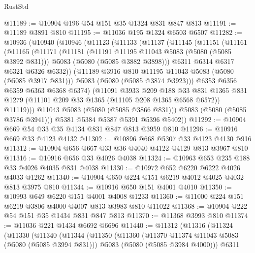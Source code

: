 \begin{lexlean}{RustStd}
\begin{coremodule}
@11189 := @10904 @196 @54 @151 @35 @1324 @831 @847 @813
@11191 := @11189 @3891 @810
@11195 := @11036 @195 @1324 @6503 @6507
@11282 := @10936
    (@10940
      (@10946
        (@11123
          (@11133
            (@11137
              (@11145
                (@11151
                  (@11161
                    (@11165
                      (@11171
                        (@11181
                          (@11191 @11195 @11043 @5083 (@5080 (@5085 @3892 @831)))
                          @5083
                          (@5080 (@5085 @3882 @3898)))
                        @6311
                        @6314
                        @6317
                        @6321
                        @6326
                        @6332))
                    (@11189 @3916 @810 @11195 @11043 @5083 (@5080 (@5085 @3917 @831)))
                    @5083
                    (@5080 (@5085 @3874 @3923)))
                  @6353
                  @6356
                  @6359
                  @6363
                  @6368
                  @6374)
                (@11091
                  @3933
                  @209
                  @188
                  @33
                  @831
                  @1365
                  @831
                  @1279
                  (@11101 @209 @33 @1365 (@11105 @208 @1365 @6568 @6572))
                  @11119)))
            @11043
            @5083
            (@5080 (@5085 @3866 @831)))
          @5083
          (@5080 (@5085 @3786 @3941)))
        @5381
        @5384
        @5387
        @5391
        @5396
        @5402))
@11292 := @10904 @669 @54 @33 @35 @4134 @831 @847 @813 @3959 @810
@11296 := @10916 @669 @33 @4123 @4132
@11302 := @10896 @668 @5307 @33 @4123 @4130 @916
@11312 := @10904 @656 @667 @33 @36 @4040 @4122 @4129 @813 @3967 @810
@11316 := @10916 @656 @33 @4026 @4038
@11324 := @10963 @653 @235 @188 @33 @4026 @4035 @831 @4038
@11330 := @10972 @652 @6220 @6222 @4026 @4033 @1262
@11340 := @10904 @650 @224 @151 @6219 @4012 @4025 @4032 @813 @3975 @810
@11344 := @10916 @650 @151 @4001 @4010
@11350 := @10993 @649 @6220 @151 @4001 @4008 @1233
@11360 := @11000 @224 @151 @6219 @3806 @4000 @4007 @813 @3983 @810 @11022
@11368 := @10904 @222 @54 @151 @35 @1434 @831 @847 @813
@11370 := @11368 @3993 @810
@11374 := @11036 @221 @1434 @6692 @6696
@11440 := @11312
    (@11316
      (@11324
        (@11330
          (@11340
            (@11344
              (@11350
                (@11360
                  (@11370 @11374 @11043 @5083 (@5080 (@5085 @3994 @831)))
                  @5083
                  (@5080 (@5085 @3984 @4000)))
                @6311

\end{coremodule}
\end{lexlean}
